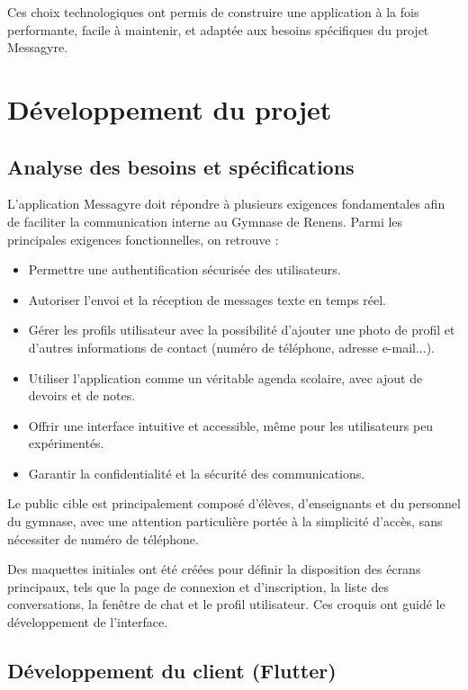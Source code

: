 \documentclass[12pt]{report}
\begin{document}
Ces choix technologiques ont permis de construire une application à la fois performante, facile à maintenir, et adaptée aux besoins spécifiques du projet Messagyre.

\chapter{Développement du projet}

\section{Analyse des besoins et spécifications}

L'application Messagyre doit répondre à plusieurs exigences fondamentales afin de faciliter la communication interne au Gymnase de Renens. Parmi les principales exigences fonctionnelles, on retrouve :

\begin{itemize}
	\item Permettre une authentification sécurisée des utilisateurs.
	\item Autoriser l'envoi et la réception de messages texte en temps réel.
	\item Gérer les profils utilisateur avec la possibilité d'ajouter une photo de profil et d'autres informations de contact (numéro de téléphone, adresse e-mail...).
	\item Utiliser l'application comme un véritable agenda scolaire, avec ajout de devoirs et de notes.
	\item Offrir une interface intuitive et accessible, même pour les utilisateurs peu expérimentés.
	\item Garantir la confidentialité et la sécurité des communications.
\end{itemize}

Le public cible est principalement composé d'élèves, d'enseignants et du personnel du gymnase, avec une attention particulière portée à la simplicité d'accès, sans nécessiter de numéro de téléphone.

Des maquettes initiales ont été créées pour définir la disposition des écrans principaux, tels que la page de connexion et d'inscription, la liste des conversations, la fenêtre de chat et le profil utilisateur. Ces croquis ont guidé le développement de l'interface.

\section{Développement du client (Flutter)}
\end{document}
